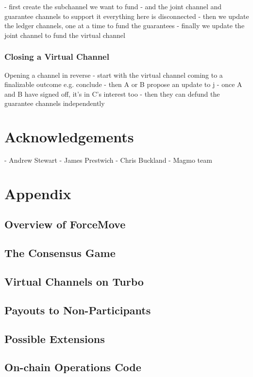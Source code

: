 \documentclass{article}
\theoremstyle{definition}
\begin{document}
- first create the subchannel we want to fund
- and the joint channel and guarantee channels to support it
everything here is disconnected
- then we update the ledger channels, one at a time to fund the guarantees
- finally we update the joint channel to fund the virtual channel

\subsubsection{Closing a Virtual Channel}

Opening a channel in reverse
- start with the virtual channel coming to a finalizable outcome e.g. conclude
- then A or B propose an update to j
- once A and B have signed off, it's in C's interest too
- then they can defund the guarantee channels independently


\section{Acknowledgements}

- Andrew Stewart
- James Prestwich
- Chris Buckland
- Magmo team


\section{Appendix}

\subsection{Overview of ForceMove}
\subsection{The Consensus Game}
\subsection{Virtual Channels on Turbo}
\subsection{Payouts to Non-Participants}
\subsection{Possible Extensions}

\subsection{On-chain Operations Code}
\end{document}
